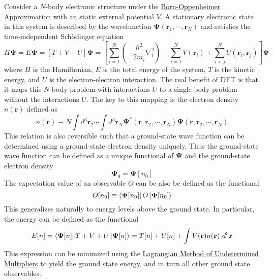 \documentclass[12pt]{article}
\newcommand{\lrp}[1]{\left( #1 \right)}
\newcommand{\lrb}[1]{\left[ #1 \right]}
\begin{document}
Consider a $N$-body electronic structure under the \href{https://en.wikipedia.org/wiki/Born\%E2\%80\%93Oppenheimer_approximation}{Born-Oppenheimer Approximation} with an static external potential $V$. A stationary electronic state in this system is described by the wavefunction $\boldsymbol{\Psi}(\textbf{r}_1,\cdots,\textbf{r}_N)$ and satisfies the time-independent Sch\"odinger equation
\begin{equation*}
    H\boldsymbol{\Psi} = E\boldsymbol{\Psi} = \lrb{T+V+U}\boldsymbol{\Psi} = \lrb{\sum_{i=1}^N \lrp{-\frac{\hbar^2}{2m_i}\nabla_i^2}+\sum_{i=1}^N V(\textbf{r}_i) + \sum_{i<j}^N U(\textbf{r}_i,\textbf{r}_j)}\boldsymbol{\Psi} 
\end{equation*}
where $H$ is the Hamiltonian, $E$ is the total energy of the system, $T$ is the kinetic energy, and $U$ is the electron-electron interaction. The real benefit of DFT is that it maps this $N$-body problem with interactions $U$ to a single-body problem without the interactions $U$. The key to this mapping is the electron density $n(\textbf{r})$ defined as
\begin{equation*}
    n(\textbf{r}) \equiv N\int d^3\textbf{r}_2 \cdots \int d^3\textbf{r}_N \boldsymbol{\Psi}^*(\textbf{r},\textbf{r}_2,\cdots,\textbf{r}_N)\boldsymbol{\Psi}(\textbf{r},\textbf{r}_2,\cdots,\textbf{r}_N)
\end{equation*}
This relation is also reversible such that a ground-state wave function can be determined using a ground-state electron density uniquely. Thus the ground-state wave function can be defined as a unique functional of $\boldsymbol{\Psi}$ and the ground-state electron density \cite{HKt1}
\begin{equation*}
    \boldsymbol{\Psi}_0 = \boldsymbol{\Psi}[n_0]
\end{equation*}
The expectation value of an observable $O$ can be also be defined as the functional
\begin{equation*}
    O[n_0] \equiv \bra{\boldsymbol{\Psi}[n_0]}O\ket{\boldsymbol{\Psi}[n_0]}
\end{equation*}
This generalizes naturally to energy levels above the ground state. In particular, the energy can be defined as the functional
\begin{equation}\label{eq:Enfunc}
    E[n] = \bra{\boldsymbol{\Psi}[n]}T+V+U\ket{\boldsymbol{\Psi}[n]} = T[n] + U[n] + \int V(\textbf{r})n(\textbf{r})~d^3\textbf{r}
\end{equation}
This expression can be minimized using the \href{https://en.wikipedia.org/wiki/Lagrange_multiplier}{Lagrangian Method of Undetermined Multipliers} to yield the ground state energy, and in turn all other ground state observables.
\end{document}
